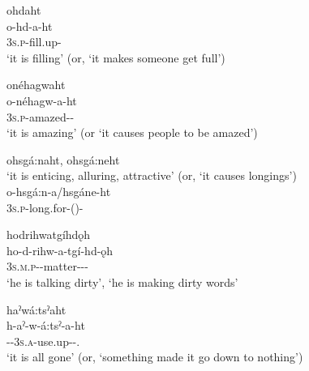 \ex ohdaht \\
\gll o-hd-a-ht\\
\textsc{3s.p}-fill.up-{\causativestative}\\
\glt ‘it is filling’ (or, ‘it makes someone get full’)


\ex onéhagwaht\\
\gll o-néhagw-a-ht\\
\textsc{3s.p}-amazed-{\joinerA}-\exsc{\causativestative}\\
\glt ‘it is amazing’ (or ‘it causes people to be amazed’)\\



\ex ohsgá:naht, ohsgá:neht\\
\glt‘it is enticing, alluring, attractive’ (or, ‘it causes longings’)\\
\gll o-hsgá:n-a/hsgáne-ht\\
\textsc{3s.p}-long.for-(\joinerA)-{\causativestative} {}\\


\ex hodrihwatgíhdǫh \\
\gll ho-d-rihw-a-tgí-hd-ǫh\\
 \textsc{3s.m.p}-{\semireflexive}-matter-{\joinerA}--{\stative}\\
\glt ‘he is talking dirty’, `he is making dirty words'


\ex haˀwá:tsˀaht\\
\gll h-aˀ-w-á:tsˀ-a-ht\\
{\translocative}-{\factual}-\textsc{3s.a}-use.up-{\joinerA}-{\causative}.{\zeropunctual}\\
\glt ‘it is all gone’ (or, ‘something made it go down to nothing’)\\


